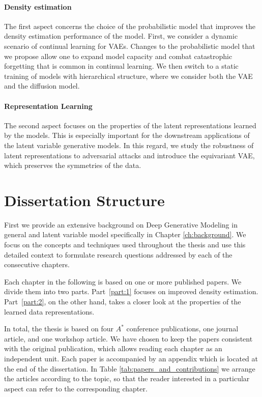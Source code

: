 \paragraph{Density estimation}
The first aspect concerns the choice of the probabilistic model that improves the density estimation performance of the model. 
First, we consider a dynamic scenario of continual learning for VAEs. 
Changes to the probabilistic model that we propose allow one to expand model capacity and combat catastrophic forgetting that is common in continual learning. 
We then switch to a static training of models with hierarchical structure, where we consider both the VAE and the diffusion model.

\paragraph{Representation Learning}
The second aspect focuses on the properties of the latent representations learned by the models.
This is especially important for the downstream applications of the latent variable generative models. 
In this regard, we study the robustness of latent representations to adversarial attacks and introduce the equivariant VAE, which preserves the symmetries of the data.


\section{Dissertation Structure}
First we provide an extensive background on Deep Generative Modeling in general and latent variable model specifically in Chapter \ref{ch:background}. We focus on the concepts and techniques used throughout the thesis and use this detailed context to formulate research questions addressed by each of the consecutive chapters. 

Each chapter in the following is based on one or more published papers. We divide them into two parts. Part~\ref{part:1} focuses on improved density estimation. Part~\ref{part:2}, on the other hand, takes a closer look at the properties of the learned data representations. 

In total, the thesis is based on four $A^*$ conference publications, one journal article, and one workshop article.  
We have chosen to keep the papers consistent with the original publication, which allows reading each chapter as an independent unit. 
Each paper is accompanied by an appendix which is located at the end of the dissertation.
In Table \ref{tab:papers_and_contributions} we arrange the articles according to the topic, so that the reader interested in a particular aspect can refer to the corresponding chapter.

